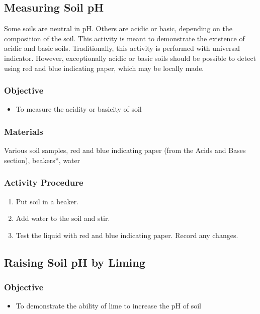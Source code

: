 \subsection{Measuring Soil pH}

Some soils are neutral in pH. Others are acidic or basic, depending on the composition of the soil. This activity is meant to demonstrate the existence of acidic and basic soils. Traditionally, this activity is performed with universal indicator. However, exceptionally acidic or basic soils should be possible to detect using red and blue indicating paper, which may be locally made.

\subsubsection{Objective}
\begin{itemize}
\item{To measure the acidity or basicity of soil}
\end{itemize}

\subsubsection{Materials}
Various soil samples, red and blue indicating paper (from the Acids and Bases section), beakers*, water

\subsubsection{Activity Procedure}
\begin{enumerate}
\item{Put soil in a beaker.}
\item{Add water to the soil and stir.}
\item{Test the liquid with red and blue indicating paper. Record any changes.}
\end{enumerate}

\subsection{Raising Soil pH by Liming}

\subsubsection{Objective}
\begin{itemize}
\item{To demonstrate the ability of lime to increase the pH of soil}
\end{itemize}

